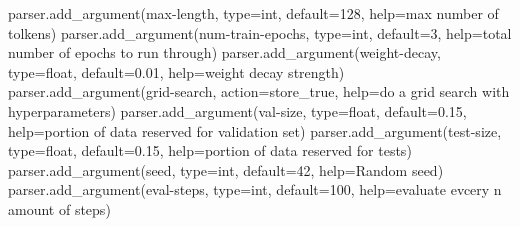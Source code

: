 \documentclass[
  letterpaper,
  DIV=11,
  numbers=noendperiod]{scrartcl}
\newenvironment{Shaded}{\begin{snugshade}}{\end{snugshade}}
\newcommand{\BuiltInTok}[1]{\textcolor[rgb]{0.00,0.23,0.31}{#1}}
\newcommand{\DecValTok}[1]{\textcolor[rgb]{0.68,0.00,0.00}{#1}}
\newcommand{\FloatTok}[1]{\textcolor[rgb]{0.68,0.00,0.00}{#1}}
\newcommand{\NormalTok}[1]{\textcolor[rgb]{0.00,0.23,0.31}{#1}}
\newcommand{\OperatorTok}[1]{\textcolor[rgb]{0.37,0.37,0.37}{#1}}
\newcommand{\StringTok}[1]{\textcolor[rgb]{0.13,0.47,0.30}{#1}}
\begin{document}
\begin{Shaded}
\begin{Highlighting}[]
\NormalTok{parser.add\_argument(}\StringTok{\textquotesingle{}{-}{-}max{-}length\textquotesingle{}}\NormalTok{, }\BuiltInTok{type}\OperatorTok{=}\BuiltInTok{int}\NormalTok{, default}\OperatorTok{=}\DecValTok{128}\NormalTok{, }\BuiltInTok{help}\OperatorTok{=}\StringTok{\textquotesingle{}max number of tolkens\textquotesingle{}}\NormalTok{)}
\NormalTok{parser.add\_argument(}\StringTok{\textquotesingle{}{-}{-}num{-}train{-}epochs\textquotesingle{}}\NormalTok{, }\BuiltInTok{type}\OperatorTok{=}\BuiltInTok{int}\NormalTok{, default}\OperatorTok{=}\DecValTok{3}\NormalTok{, }\BuiltInTok{help}\OperatorTok{=}\StringTok{\textquotesingle{}total number of epochs to run through\textquotesingle{}}\NormalTok{)}
\NormalTok{parser.add\_argument(}\StringTok{\textquotesingle{}{-}{-}weight{-}decay\textquotesingle{}}\NormalTok{, }\BuiltInTok{type}\OperatorTok{=}\BuiltInTok{float}\NormalTok{, default}\OperatorTok{=}\FloatTok{0.01}\NormalTok{, }\BuiltInTok{help}\OperatorTok{=}\StringTok{\textquotesingle{}weight decay strength\textquotesingle{}}\NormalTok{)}
\NormalTok{parser.add\_argument(}\StringTok{\textquotesingle{}{-}{-}grid{-}search\textquotesingle{}}\NormalTok{, action}\OperatorTok{=}\StringTok{\textquotesingle{}store\_true\textquotesingle{}}\NormalTok{, }\BuiltInTok{help}\OperatorTok{=}\StringTok{\textquotesingle{}do a grid search with hyperparameters\textquotesingle{}}\NormalTok{)}
\NormalTok{parser.add\_argument(}\StringTok{\textquotesingle{}{-}{-}val{-}size\textquotesingle{}}\NormalTok{, }\BuiltInTok{type}\OperatorTok{=}\BuiltInTok{float}\NormalTok{, default}\OperatorTok{=}\FloatTok{0.15}\NormalTok{, }\BuiltInTok{help}\OperatorTok{=}\StringTok{\textquotesingle{}portion of data reserved for validation set\textquotesingle{}}\NormalTok{)}
\NormalTok{parser.add\_argument(}\StringTok{\textquotesingle{}{-}{-}test{-}size\textquotesingle{}}\NormalTok{, }\BuiltInTok{type}\OperatorTok{=}\BuiltInTok{float}\NormalTok{, default}\OperatorTok{=}\FloatTok{0.15}\NormalTok{, }\BuiltInTok{help}\OperatorTok{=}\StringTok{\textquotesingle{}portion of data reserved for tests\textquotesingle{}}\NormalTok{)}
\NormalTok{parser.add\_argument(}\StringTok{\textquotesingle{}{-}{-}seed\textquotesingle{}}\NormalTok{, }\BuiltInTok{type}\OperatorTok{=}\BuiltInTok{int}\NormalTok{, default}\OperatorTok{=}\DecValTok{42}\NormalTok{, }\BuiltInTok{help}\OperatorTok{=}\StringTok{\textquotesingle{}Random seed\textquotesingle{}}\NormalTok{)}
\NormalTok{parser.add\_argument(}\StringTok{\textquotesingle{}{-}{-}eval{-}steps\textquotesingle{}}\NormalTok{, }\BuiltInTok{type}\OperatorTok{=}\BuiltInTok{int}\NormalTok{, default}\OperatorTok{=}\DecValTok{100}\NormalTok{, }\BuiltInTok{help}\OperatorTok{=}\StringTok{\textquotesingle{}evaluate evcery n amount of steps\textquotesingle{}}\NormalTok{)}

\end{Highlighting}
\end{Shaded}
\end{document}
